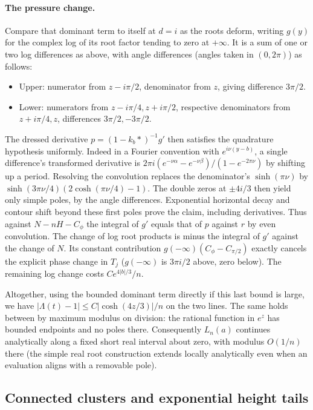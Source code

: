 \paragraph{The pressure change.}
Compare that dominant term to itself at \(d=i\) as the roots deform, writing \(g(y)\) for the complex log of its root factor tending to zero at \(+\infty\). It is a sum of one or two log differences as above, with angle differences (angles taken in \((0,2\pi)\)) as follows:
\begin{itemize}
\item Upper: numerator from \(z-i\pi/2\), denominator from \(z\), giving difference \(3\pi/2\).
\item Lower: numerators from \(z-i\pi/4,z+i\pi/2\), respective denominators from \(z+i\pi/4,z\), differences \(3\pi/2,-3\pi/2\).
\end{itemize}

The dressed derivative \(p=(1-k_b*)^{-1}g'\) then satisfies the quadrature hypothesis uniformly. Indeed in a Fourier convention with \(e^{i\nu(y-b)}\), a single difference's transformed derivative is \(2\pi i(e^{-\nu\alpha}-e^{-\nu\beta})/(1-e^{-2\pi\nu})\) by shifting up a period. Resolving the convolution replaces the denominator's \(\sinh(\pi\nu)\) by \(\sinh(3\pi\nu/4)(2\cosh(\pi\nu/4)-1)\). The double zeros at \(\pm4i/3\) then yield only simple poles, by the angle differences. Exponential horizontal decay and contour shift beyond these first poles prove the claim, including derivatives. Thus against \(N-nH-C_\phi\) the integral of \(g'\) equals that of \(p\) against \(r\) by even convolution. The change of log root products is minus the integral of \(g'\) against the change of \(N\). Its constant contribution \(g(-\infty)(C_\phi-C_{\pi/2})\) exactly cancels the explicit phase change in \(T_j\) (\(g(-\infty)\) is \(3\pi i/2\) above, zero below). The remaining log change costs \(C e^{4|b|/3}/n\).

Altogether, using the bounded dominant term directly if this last bound is large, we have \(|\Lambda(t)-1|\le C |\cosh(4z/3)|/n\) on the two lines. The same holds between by maximum modulus on division: the rational function in \(e^z\) has bounded endpoints and no poles there. Consequently \(L_n(a)\) continues analytically along a fixed short real interval about zero, with modulus \(O(1/n)\) there (the simple real root construction extends locally analytically even when an evaluation aligns with a removable pole).

\subsection{Connected clusters and exponential height tails}

